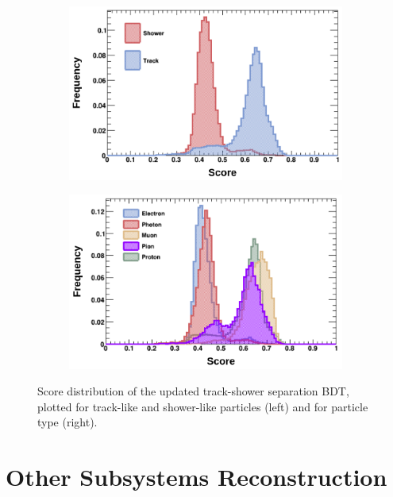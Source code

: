 \begin{figure}[htbp!]
        \centering
        \begin{subfigure}[b]{0.495\textwidth}
            \centering
            \includegraphics[width=\textwidth]{bdt_score_trk_shw}
            \caption{}%
        \end{subfigure}
        \hfill
        \begin{subfigure}[b]{0.495\textwidth}  
            \centering 
            \includegraphics[width=\textwidth]{bdt_score_particle}
            \caption{}%
        \end{subfigure}
        \caption[bdt_score]{
	Score distribution of the updated track-shower separation BDT, plotted for track-like and shower-like particles (left) and for particle type (right).
	}
        \label{fig:bdt_score}
\end{figure}

\section{Other Subsystems Reconstruction}
\label{sec:reco_others}

